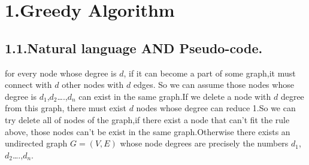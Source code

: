 \documentclass[10pt]{article}
\begin{document}
\mdxtitleblockstart{}
\mdxauthorstart{}


\mdxauthorend\mdtitleauthorrunning{}{}\mdxtitleblockend%

\section{1.\hspace*{0.5em}Greedy Algorithm}\label{sec-greedy-algorithm}%

\subsection{1.1.\hspace*{0.5em}Natural language AND Pseudo-code.}\label{sec-natural-language-and-pseudo-code}%

\noindent{}\hspace*{1em}for every node whose degree is $d$, if it can become a part of some graph,it must connect with $d$ 
other nodes with $d$ edges. So we can assume those nodes whose degree is $d_1$,$d_2$\dots{}.,$d_n$ can 
exist in the same graph.If we delete a node with $d$ degree from this graph, there must exist $d$ nodes 
whose degree can reduce 1.So we can try delete all of nodes of the graph,if there exist a node that 
can't fit the rule above, those nodes can't be exist in the same graph.Otherwise there exists an undirected 
graph $G = (V, E)$ whose node degrees are precisely the numbers  $d_1$,$d_2$\dots{}.,$d_n$. %

\mdhr{}%
\end{document}
